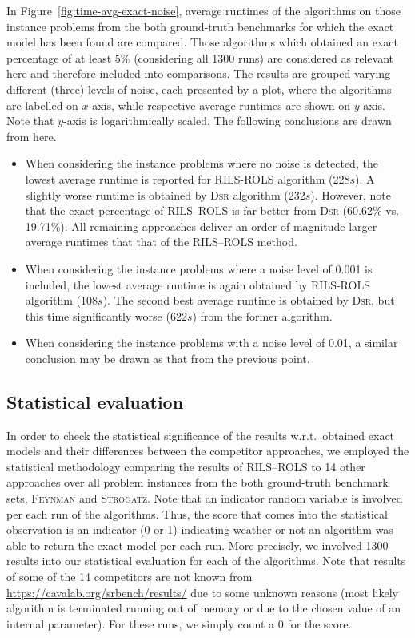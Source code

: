 \documentclass[a4paper,12pt]{elsarticle}
\begin{document}
In Figure~\ref{fig:time-avg-exact-noise}, average runtimes of the algorithms on those instance problems from the both ground-truth benchmarks for which the exact model has  been found are compared. Those algorithms which obtained an exact percentage of at least 5\% (considering all 1300 runs) are considered as relevant here and therefore included into comparisons.  The results are grouped varying different (three) levels of noise, each presented by a plot, where the algorithms are labelled on $x$-axis, while respective average runtimes are shown on $y$-axis. Note that $y$-axis is logarithmically scaled. The following conclusions are drawn from here.

\begin{itemize}
	\item When considering the instance problems where no noise is detected, the lowest average runtime  is reported for \textsc{RILS}-\textsc{ROLS} algorithm (228$s$). A slightly worse runtime is obtained by \textsc{Dsr} algorithm (232$s$).  However, note that the exact percentage of \textsc{RILS}--\textsc{ROLS} is far better from \textsc{Dsr} (60.62\% vs. 19.71\%). 	All remaining approaches deliver an order of magnitude larger average runtimes that that of the \textsc{RILS}--\textsc{ROLS} method. 
	\item  When considering the instance problems where a noise level of 0.001 is included,    the lowest average runtime  is again obtained by \textsc{RILS}-\textsc{ROLS} algorithm (108$s$). The second best average runtime is obtained by \textsc{Dsr}, but this time significantly worse (622$s$) from the former algorithm. 
	\item When considering the instance problems with a noise level of 0.01, a similar conclusion may be drawn as that from the previous point. 
\end{itemize}



\subsection{Statistical evaluation}

In order to check the statistical significance of the results w.r.t.\ obtained exact models and their differences between the competitor approaches, we employed the statistical methodology comparing the results of \textsc{RILS}--\textsc{ROLS} to 14 other approaches over all problem instances from the both ground-truth benchmark sets, \textsc{Feynman} and \textsc{Strogatz}. Note that an indicator random variable is involved per each run of the algorithms. Thus, the score that comes into the statistical observation is an indicator (0 or 1) indicating weather or not an algorithm was able to return the exact model per each run. More precisely, we involved 1300 results into our statistical evaluation for each of the algorithms. Note that  results of some of the 14 competitors are not known from \url{https://cavalab.org/srbench/results/} due to some unknown reasons (most likely algorithm is terminated running out of memory or due to the chosen  value of an internal parameter). For these runs, we simply count a 0 for the score.   
\end{document}
